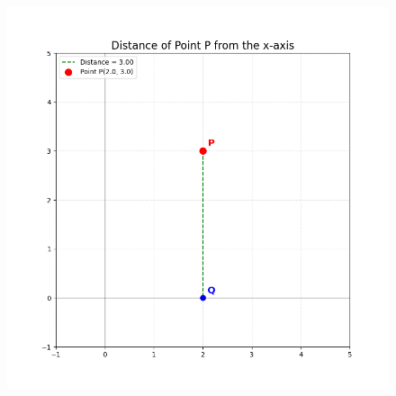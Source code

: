 \documentclass[journal]{IEEEtran}
\begin{document}
	\begin{figure}[H]
		\centering
		\includegraphics[width = 0.8\columnwidth]{Figure_1.png}
		\caption*{}
		\label{fig_dist}
	\end{figure}
	
\end{document}
